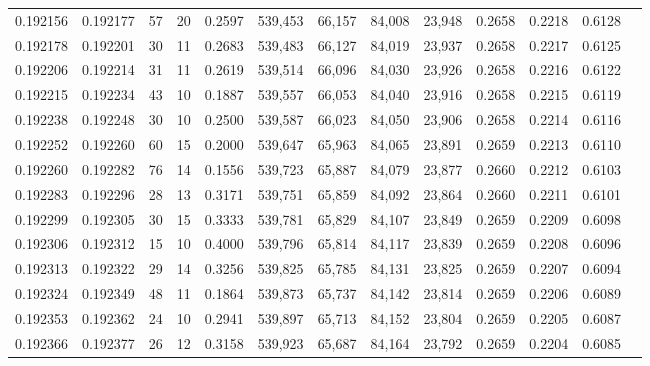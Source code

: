 \begin{tabular}{rrrrrrrrrrrrr}
0.192156 & 0.192177 &    57 &  20 &                                     0.2597 & 539,453 &  66,157 &  84,008 &  23,948 & 0.2658 & 0.2218 & 0.6128 \\
0.192178 & 0.192201 &    30 &  11 &                                     0.2683 & 539,483 &  66,127 &  84,019 &  23,937 & 0.2658 & 0.2217 & 0.6125 \\
0.192206 & 0.192214 &    31 &  11 &                                     0.2619 & 539,514 &  66,096 &  84,030 &  23,926 & 0.2658 & 0.2216 & 0.6122 \\
0.192215 & 0.192234 &    43 &  10 &                                     0.1887 & 539,557 &  66,053 &  84,040 &  23,916 & 0.2658 & 0.2215 & 0.6119 \\
0.192238 & 0.192248 &    30 &  10 &                                     0.2500 & 539,587 &  66,023 &  84,050 &  23,906 & 0.2658 & 0.2214 & 0.6116 \\
0.192252 & 0.192260 &    60 &  15 &                                     0.2000 & 539,647 &  65,963 &  84,065 &  23,891 & 0.2659 & 0.2213 & 0.6110 \\
0.192260 & 0.192282 &    76 &  14 &                                     0.1556 & 539,723 &  65,887 &  84,079 &  23,877 & 0.2660 & 0.2212 & 0.6103 \\
0.192283 & 0.192296 &    28 &  13 &                                     0.3171 & 539,751 &  65,859 &  84,092 &  23,864 & 0.2660 & 0.2211 & 0.6101 \\
0.192299 & 0.192305 &    30 &  15 &                                     0.3333 & 539,781 &  65,829 &  84,107 &  23,849 & 0.2659 & 0.2209 & 0.6098 \\
0.192306 & 0.192312 &    15 &  10 &                                     0.4000 & 539,796 &  65,814 &  84,117 &  23,839 & 0.2659 & 0.2208 & 0.6096 \\
0.192313 & 0.192322 &    29 &  14 &                                     0.3256 & 539,825 &  65,785 &  84,131 &  23,825 & 0.2659 & 0.2207 & 0.6094 \\
0.192324 & 0.192349 &    48 &  11 &                                     0.1864 & 539,873 &  65,737 &  84,142 &  23,814 & 0.2659 & 0.2206 & 0.6089 \\
0.192353 & 0.192362 &    24 &  10 &                                     0.2941 & 539,897 &  65,713 &  84,152 &  23,804 & 0.2659 & 0.2205 & 0.6087 \\
0.192366 & 0.192377 &    26 &  12 &                                     0.3158 & 539,923 &  65,687 &  84,164 &  23,792 & 0.2659 & 0.2204 & 0.6085 \\

\end{tabular}
